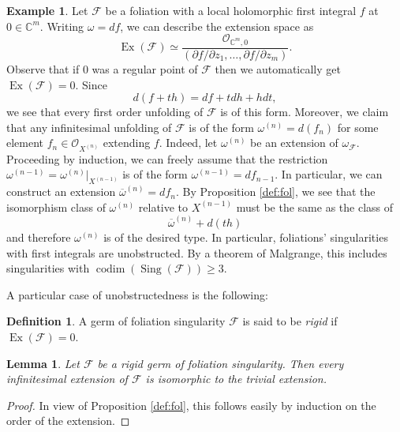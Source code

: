\documentclass[reqno]{amsart}
\theoremstyle{plain}
\newcommand\C{\mathbb{C}}
\newcommand{\OO}{\mathcal{O}}
\newcommand{\F}{\mathscr{F}}
\DeclareMathOperator{\Ex}{Ex}
\DeclareMathOperator{\Sing}{Sing}
\DeclareMathOperator{\codim}{codim}
\newtheorem{lemma}[theorem]{Lemma}
\theoremstyle{definition}
\newtheorem{definition}[theorem]{Definition}
\newtheorem{example}[theorem]{Example}
\theoremstyle{named}
\begin{document}
\begin{example}{\label{unf_int1}}
Let $\F$ be a foliation with a local holomorphic first integral $f$ at $0\in \C^m$. Writing $\omega=df$, we can describe the extension space as
\[
\Ex(\F) \simeq \frac{\OO_{\C^m,0}}{(\partial f/\partial z_1,\dots,\partial f/\partial z_m)}.
\]
Observe that if $0$ was a regular point of $\F$ then we automatically get $\Ex(\F)=0$. Since
$$ d(f+t h)= df+t dh + hdt,$$
we see that every first order unfolding of $\F$ is of this form. 
Moreover, we claim that any infinitesimal unfolding of $\F$ is of the form $\omega^{(n)}=d(f_n)$ for some element $f_n\in \OO_{X^{(n)}}$ extending $f$.
Indeed, let $\omega^{(n)}$ be an extension of $\omega_\F$. Proceeding by induction, we can freely assume that the restriction $\omega^{(n-1)}=\omega^{(n)}\vert_{X^{(n-1)}}$ is of the form $\omega^{(n-1)}=df_{n-1}$. In particular, we can construct an extension $\overline{\omega}^{(n)}=df_n$. By Proposition \ref{def:fol}, we see that the isomorphism class of $\omega^{(n)}$ relative to $X^{(n-1)}$ must be the same as the class of
$$\overline{\omega}^{(n)}+ d(t h)$$
 and therefore $\omega^{(n)}$ is of the desired type. In particular, foliations' singularities with first integrals are unobstructed. By a theorem of Malgrange, this includes singularities with $\codim(\Sing(\F))\geq 3$.
\end{example}

A particular case of unobstructedness is the following:

\begin{definition}
    A germ of foliation singularity $\F$ is said to be \textit{rigid} if $\Ex(\F)=0$.
\end{definition}

\begin{lemma}
    Let $\F$ be a \textit{rigid} germ of foliation singularity. Then every infinitesimal extension of $\F$ is isomorphic to the trivial extension. 
\end{lemma}
\begin{proof}
In view of Proposition \ref{def:fol}, this follows easily by induction on the order of the extension.
\end{proof}
\end{document}
